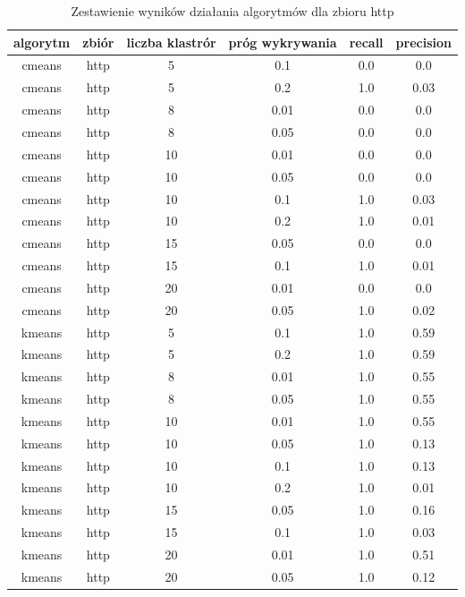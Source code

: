 \documentclass{classrep}
\begin{document}
{{            \begin{table}[!htbp]
                \footnotesize
                \centering
                \begin{tabular}{|c|c|c|c|c|c|}
                    \hline
                    algorytm & zbiór & liczba klastrór & próg wykrywania & recall & precision \\ \hline
                    cmeans & http & 5 & 0.1 & 0.0 & 0.0 \\
                    cmeans & http & 5 & 0.2 & 1.0 & 0.03 \\
                    cmeans & http & 8 & 0.01 & 0.0 & 0.0 \\
                    cmeans & http & 8 & 0.05 & 0.0 & 0.0 \\
                    cmeans & http & 10 & 0.01 & 0.0 & 0.0 \\
                    cmeans & http & 10 & 0.05 & 0.0 & 0.0 \\
                    cmeans & http & 10 & 0.1 & 1.0 & 0.03 \\
                    cmeans & http & 10 & 0.2 & 1.0 & 0.01 \\
                    cmeans & http & 15 & 0.05 & 0.0 & 0.0 \\
                    cmeans & http & 15 & 0.1 & 1.0 & 0.01 \\
                    cmeans & http & 20 & 0.01 & 0.0 & 0.0 \\
                    cmeans & http & 20 & 0.05 & 1.0 & 0.02 \\ \hline
                    kmeans & http & 5 & 0.1 & 1.0 & 0.59 \\
                    kmeans & http & 5 & 0.2 & 1.0 & 0.59 \\
                    kmeans & http & 8 & 0.01 & 1.0 & 0.55 \\
                    kmeans & http & 8 & 0.05 & 1.0 & 0.55 \\
                    kmeans & http & 10 & 0.01 & 1.0 & 0.55 \\
                    kmeans & http & 10 & 0.05 & 1.0 & 0.13 \\
                    kmeans & http & 10 & 0.1 & 1.0 & 0.13 \\
                    kmeans & http & 10 & 0.2 & 1.0 & 0.01 \\
                    kmeans & http & 15 & 0.05 & 1.0 & 0.16 \\
                    kmeans & http & 15 & 0.1 & 1.0 & 0.03 \\
                    kmeans & http & 20 & 0.01 & 1.0 & 0.51 \\
                    kmeans & http & 20 & 0.05 & 1.0 & 0.12 \\ \hline
                \end{tabular}
                \caption
                {Zestawienie wyników działania algorytmów dla zbioru http}
                \label{tab:http}
            \end{table}
            \FloatBarrier
        }
    }
\end{document}
